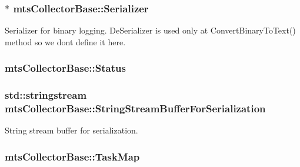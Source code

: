 \subsubsection[{Serializer}]{$\ast$ mts\+Collector\+Base\+::\+Serializer\hspace{0.3cm}{\ttfamily [protected]}}\label{classmts_collector_base_abf646aaaee11b73bf1fff9f31131fac1}
Serializer for binary logging. De\+Serializer is used only at Convert\+Binary\+To\+Text() method so we don\textquotesingle{}t define it here. \hypertarget{classmts_collector_base_ae5b1e57c993774b77da77f1e1fc7d73c}{}
\subsubsection[{Status}]{ mts\+Collector\+Base\+::\+Status\hspace{0.3cm}{\ttfamily [protected]}}\label{classmts_collector_base_ae5b1e57c993774b77da77f1e1fc7d73c}
\hypertarget{classmts_collector_base_a782f339bd561cc62d195544fdb873834}{}
\subsubsection[{String\+Stream\+Buffer\+For\+Serialization}]{\setlength{\rightskip}{0pt plus 5cm}std\+::stringstream mts\+Collector\+Base\+::\+String\+Stream\+Buffer\+For\+Serialization\hspace{0.3cm}{\ttfamily [protected]}}\label{classmts_collector_base_a782f339bd561cc62d195544fdb873834}
String stream buffer for serialization. \hypertarget{classmts_collector_base_a4e9b221e6cdeb2fbddaf44ffbe9e3b0e}{}
\subsubsection[{Task\+Map}]{ mts\+Collector\+Base\+::\+Task\+Map\hspace{0.3cm}{\ttfamily [protected]}}\label{classmts_collector_base_a4e9b221e6cdeb2fbddaf44ffbe9e3b0e}
\hypertarget{classmts_collector_base_ab6c33b31e4651991098cd0963a575d24}{}
